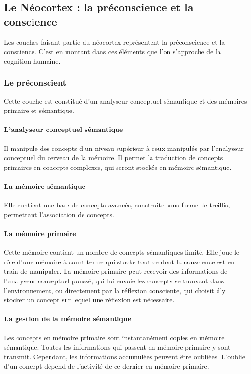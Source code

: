 \subsection{Le Néocortex : la préconscience et la conscience}
Les couches faisant partie du néocortex représentent la préconscience et la
conscience. C'est en montant dans ces éléments que l'on s'approche de la cognition humaine.

\subsubsection{Le préconscient} Cette couche est constitué d'un analyseur
conceptuel sémantique et des mémoires primaire et sémantique.

\paragraph{L'analyseur conceptuel sémantique} Il manipule des concepts d'un niveau
supérieur à ceux manipulés par l’analyseur conceptuel du cerveau de la mémoire. Il permet la
traduction de concepts primaires en concepts complexes, qui seront stockés en mémoire
sémantique.

\paragraph{La mémoire sémantique} Elle contient une base de concepts avancés, construite sous forme de treillis, permettant l'association de concepts.

\paragraph{La mémoire primaire} Cette mémoire contient un nombre de concepts
sémantiques limité. Elle joue le rôle d'une mémoire à court terme qui stocke tout ce dont la conscience est en train de manipuler. La mémoire primaire peut recevoir des informations de l’analyseur conceptuel poussé, qui lui envoie les concepts se trouvant dans l’environnement, ou directement par la réflexion consciente, qui choisit d’y stocker un concept sur lequel une réflexion est nécessaire.

\paragraph{La gestion de la mémoire sémantique} Les concepts en mémoire primaire sont instantanément copiés en mémoire sémantique. Toutes les informations qui passent en
mémoire primaire y sont transmit. Cependant, les informations accumulées peuvent être oubliées.
L'oublie d'un concept dépend de l'activité de ce dernier en mémoire primaire.

